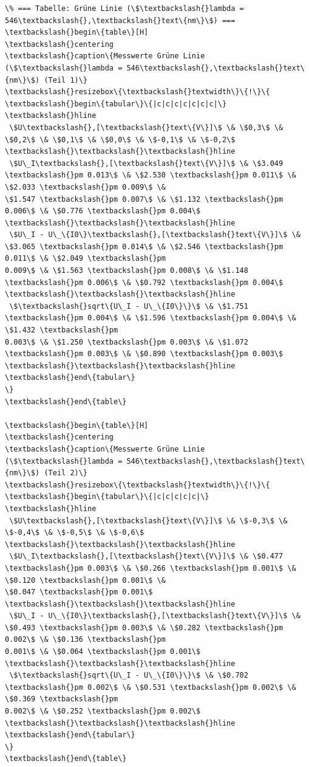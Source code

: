 \begin{Verbatim}[commandchars=\\\{\}]
\% === Tabelle: Grüne Linie (\$\textbackslash{}lambda = 546\textbackslash{},\textbackslash{}text\{nm\}\$) ===
\textbackslash{}begin\{table\}[H]
\textbackslash{}centering
\textbackslash{}caption\{Messwerte Grüne Linie (\$\textbackslash{}lambda = 546\textbackslash{},\textbackslash{}text\{nm\}\$) (Teil 1)\}
\textbackslash{}resizebox\{\textbackslash{}textwidth\}\{!\}\{
\textbackslash{}begin\{tabular\}\{|c|c|c|c|c|c|c|\}
\textbackslash{}hline
 \$U\textbackslash{},[\textbackslash{}text\{V\}]\$ \& \$0,3\$ \& \$0,2\$ \& \$0,1\$ \& \$0,0\$ \& \$-0,1\$ \& \$-0,2\$ \textbackslash{}\textbackslash{}\textbackslash{}hline
 \$U\_I\textbackslash{},[\textbackslash{}text\{V\}]\$ \& \$3.049 \textbackslash{}pm 0.013\$ \& \$2.530 \textbackslash{}pm 0.011\$ \& \$2.033 \textbackslash{}pm 0.009\$ \&
\$1.547 \textbackslash{}pm 0.007\$ \& \$1.132 \textbackslash{}pm 0.006\$ \& \$0.776 \textbackslash{}pm 0.004\$ \textbackslash{}\textbackslash{}\textbackslash{}hline
 \$U\_I - U\_\{I0\}\textbackslash{},[\textbackslash{}text\{V\}]\$ \& \$3.065 \textbackslash{}pm 0.014\$ \& \$2.546 \textbackslash{}pm 0.011\$ \& \$2.049 \textbackslash{}pm
0.009\$ \& \$1.563 \textbackslash{}pm 0.008\$ \& \$1.148 \textbackslash{}pm 0.006\$ \& \$0.792 \textbackslash{}pm 0.004\$ \textbackslash{}\textbackslash{}\textbackslash{}hline
 \$\textbackslash{}sqrt\{U\_I - U\_\{I0\}\}\$ \& \$1.751 \textbackslash{}pm 0.004\$ \& \$1.596 \textbackslash{}pm 0.004\$ \& \$1.432 \textbackslash{}pm
0.003\$ \& \$1.250 \textbackslash{}pm 0.003\$ \& \$1.072 \textbackslash{}pm 0.003\$ \& \$0.890 \textbackslash{}pm 0.003\$ \textbackslash{}\textbackslash{}\textbackslash{}hline
\textbackslash{}end\{tabular\}
\}
\textbackslash{}end\{table\}

\textbackslash{}begin\{table\}[H]
\textbackslash{}centering
\textbackslash{}caption\{Messwerte Grüne Linie (\$\textbackslash{}lambda = 546\textbackslash{},\textbackslash{}text\{nm\}\$) (Teil 2)\}
\textbackslash{}resizebox\{\textbackslash{}textwidth\}\{!\}\{
\textbackslash{}begin\{tabular\}\{|c|c|c|c|c|\}
\textbackslash{}hline
 \$U\textbackslash{},[\textbackslash{}text\{V\}]\$ \& \$-0,3\$ \& \$-0,4\$ \& \$-0,5\$ \& \$-0,6\$ \textbackslash{}\textbackslash{}\textbackslash{}hline
 \$U\_I\textbackslash{},[\textbackslash{}text\{V\}]\$ \& \$0.477 \textbackslash{}pm 0.003\$ \& \$0.266 \textbackslash{}pm 0.001\$ \& \$0.120 \textbackslash{}pm 0.001\$ \&
\$0.047 \textbackslash{}pm 0.001\$ \textbackslash{}\textbackslash{}\textbackslash{}hline
 \$U\_I - U\_\{I0\}\textbackslash{},[\textbackslash{}text\{V\}]\$ \& \$0.493 \textbackslash{}pm 0.003\$ \& \$0.282 \textbackslash{}pm 0.002\$ \& \$0.136 \textbackslash{}pm
0.001\$ \& \$0.064 \textbackslash{}pm 0.001\$ \textbackslash{}\textbackslash{}\textbackslash{}hline
 \$\textbackslash{}sqrt\{U\_I - U\_\{I0\}\}\$ \& \$0.702 \textbackslash{}pm 0.002\$ \& \$0.531 \textbackslash{}pm 0.002\$ \& \$0.369 \textbackslash{}pm
0.002\$ \& \$0.252 \textbackslash{}pm 0.002\$ \textbackslash{}\textbackslash{}\textbackslash{}hline
\textbackslash{}end\{tabular\}
\}
\textbackslash{}end\{table\}



\end{Verbatim}
